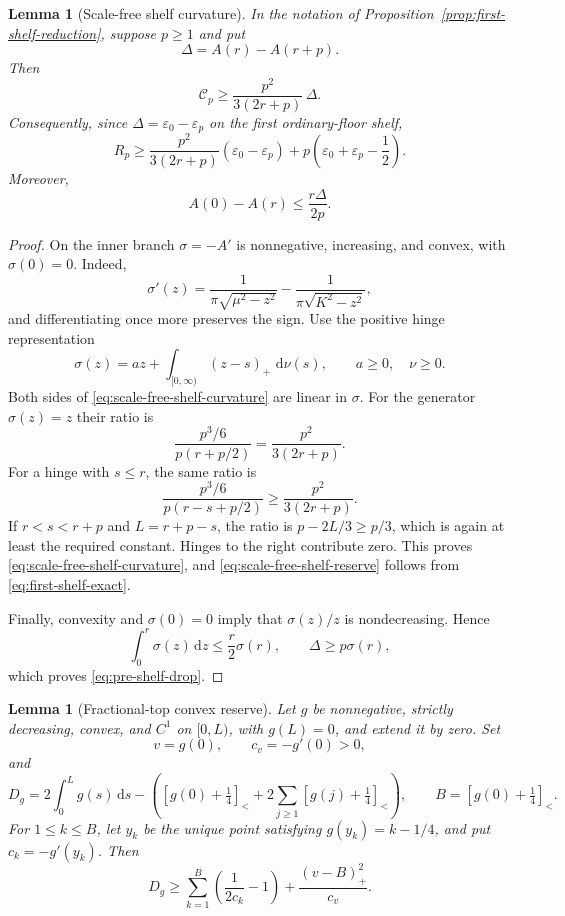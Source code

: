 \documentclass[11pt]{article}
\newtheorem{lemma}[theorem]{Lemma}
\theoremstyle{remark}
\newcommand{\sbr}[1]{[#1]_{<}}
\newcommand{\dd}{\,\mathrm d}
\begin{document}
\begin{lemma}[Scale-free shelf curvature]
\label{lem:scale-free-shelf-curvature}
In the notation of Proposition~\ref{prop:first-shelf-reduction}, suppose
$p\geq1$ and put
\[
 \Delta=A(r)-A(r+p).
\]
Then
\begin{equation}
 \mathcal C_p\geq
 \frac{p^2}{3(2r+p)}\,\Delta.
 \label{eq:scale-free-shelf-curvature}
\end{equation}
Consequently, since
$\Delta=\varepsilon_0-\varepsilon_p$ on the first ordinary-floor shelf,
\begin{equation}
 R_p\geq
 \frac{p^2}{3(2r+p)}
  (\varepsilon_0-\varepsilon_p)
 +p\left(\varepsilon_0+\varepsilon_p-\frac12\right).
 \label{eq:scale-free-shelf-reserve}
\end{equation}
Moreover,
\begin{equation}
 A(0)-A(r)\leq\frac{r\Delta}{2p}.
 \label{eq:pre-shelf-drop}
\end{equation}
\end{lemma}

\begin{proof}
On the inner branch $\sigma=-A'$ is nonnegative, increasing, and convex,
with $\sigma(0)=0$.  Indeed,
\[
 \sigma'(z)=\frac1{\pi\sqrt{\mu^2-z^2}}
 -\frac1{\pi\sqrt{K^2-z^2}},
\]
and differentiating once more preserves the sign.  Use the positive hinge
representation
\[
 \sigma(z)=az+\int_{[0,\infty)}(z-s)_+\,\dd\nu(s),
 \qquad a\geq0,\quad \nu\geq0.
\]
Both sides of \eqref{eq:scale-free-shelf-curvature} are linear in
$\sigma$.  For the generator $\sigma(z)=z$ their ratio is
\[
 \frac{p^3/6}{p(r+p/2)}
 =\frac{p^2}{3(2r+p)}.
\]
For a hinge with $s\leq r$, the same ratio is
\[
 \frac{p^3/6}{p(r-s+p/2)}
 \geq\frac{p^2}{3(2r+p)}.
\]
If $r<s<r+p$ and $L=r+p-s$, the ratio is
$p-2L/3\geq p/3$, which is again at least the required constant.
Hinges to the right contribute zero.  This proves
\eqref{eq:scale-free-shelf-curvature}, and
\eqref{eq:scale-free-shelf-reserve} follows from
\eqref{eq:first-shelf-exact}.

Finally, convexity and $\sigma(0)=0$ imply that $\sigma(z)/z$ is
nondecreasing.  Hence
\[
 \int_0^r\sigma(z)\dd z\leq\frac r2\sigma(r),
 \qquad
 \Delta\geq p\sigma(r),
\]
which proves \eqref{eq:pre-shelf-drop}.
\end{proof}

\begin{lemma}[Fractional-top convex reserve]
\label{lem:convex-level-reserve}
Let $g$ be nonnegative, strictly decreasing, convex, and $C^1$ on
$[0,L)$, with $g(L)=0$, and extend it by zero.  Set
\[
 v=g(0),\qquad c_v=-g'(0)>0,
\]
and
\[
 D_g=2\int_0^Lg(s)\dd s-
 \left(
 \sbr{g(0)+\tfrac14}
 +2\sum_{j\geq1}\sbr{g(j)+\tfrac14}
 \right),
 \qquad B=\sbr{g(0)+\tfrac14}.
\]
For $1\leq k\leq B$, let $y_k$ be the unique point satisfying
$g(y_k)=k-1/4$, and put $c_k=-g'(y_k)$.  Then
\begin{equation}
 \boxed{
 D_g\geq\sum_{k=1}^{B}
 \left(\frac1{2c_k}-1\right)
 +\frac{(v-B)_+^2}{c_v}.}
 \label{eq:convex-level-reserve}
\end{equation}
\end{lemma}
\end{document}
